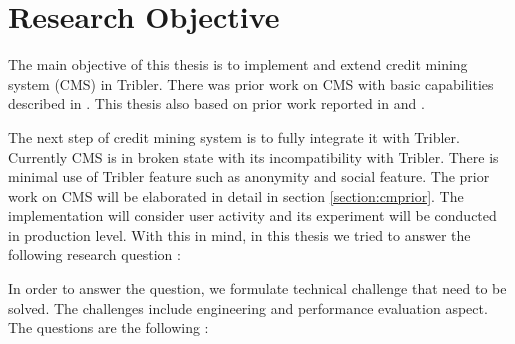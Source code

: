 
%



\section{Research Objective}
The main objective of this thesis is to implement and extend credit mining system (CMS) in Tribler. There was prior work on CMS with basic capabilities described in \cite{2015:creditmining:capota}. This thesis also based on prior work reported in  \cite{2013:investmentcm:capota} and  \cite{2014:bwmarket:capota}. 

The next step of credit mining system is to fully integrate it with Tribler. Currently CMS is in broken state with its incompatibility with Tribler. There is minimal use of Tribler feature such as anonymity and social feature. The prior work on CMS will be elaborated in detail in section \ref{section:cmprior}. The implementation will consider user activity and its experiment will be conducted in production level. With this in mind, in this thesis we tried to answer the following research question : 


In order to answer the question, we formulate technical challenge that need to be solved. The challenges include engineering and performance evaluation aspect. The questions are the following : 

